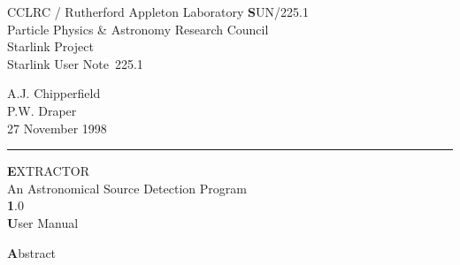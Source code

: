\documentclass[twoside,11pt]{article}
\newcommand{\stardoccategory}  {Starlink User Note}
\newcommand{\stardocinitials}  {SUN}
\newcommand{\stardocnumber}    {225.1}
\newcommand{\stardocauthors}   {A.J. Chipperfield\\
                                P.W. Draper}
\newcommand{\stardocdate}      {27 November 1998}
\newcommand{\stardoctitle}     {EXTRACTOR\\
                                An Astronomical Source Detection Program}
\newcommand{\stardocversion}   {1.0}
\newcommand{\stardocmanual}    {User Manual}
\newcommand{\stardocname}{\stardocinitials /\stardocnumber}
\newenvironment{latexonly}{}{}
\renewcommand{\_}{\texttt{\symbol{95}}}
\begin{document}
\thispagestyle{empty}

\begin{latexonly}
   CCLRC / {\textsc Rutherford Appleton Laboratory} \hfill {\textbf \stardocname}\\
   {\large Particle Physics \& Astronomy Research Council}\\
   {\large Starlink Project\\}
   {\large \stardoccategory\ \stardocnumber}
   \begin{flushright}
   \stardocauthors\\
   \stardocdate
   \end{flushright}
   \vspace{-4mm}
   \rule{\textwidth}{0.5mm}
   \vspace{5mm}
   \begin{center}
   {\Huge\textbf  \stardoctitle \\ [2.5ex]}
   {\LARGE\textbf \stardocversion \\ [4ex]}
   {\Huge\textbf  \stardocmanual}
   \end{center}
   \vspace{5mm}


   \vspace{10mm}
   \begin{center}
      {\Large\textbf Abstract}
   \end{center}
\end{latexonly}
\end{document}
